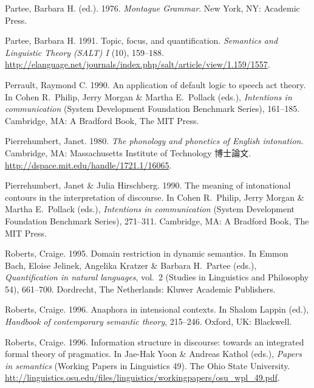 \documentclass{goken}
\newcommand{\ori}[1]{\noindent\textcolor[gray]{0.7}{\fontsize{8pt}{8pt}\selectfont{\textsf{(p.~#1)}}} }
\begin{document}
\begin{thebibliography}{74}
Partee, Barbara H. (ed.). 1976.
\newblock \emph{Montague {G}rammar}.
\newblock New York, NY: Academic Press.

Partee, Barbara H. 1991.
\newblock Topic, focus, and quantification.
\newblock \emph{Semantics and Linguistic Theory (SALT) I} (10), 159--188.
\newblock
  \urlprefix\url{http://elanguage.net/journals/index.php/salt/article/view/1.159/1557}.

Perrault, Raymond C. 1990.
\newblock An application of default logic to speech act theory.
\newblock In Cohen R.~Philip, Jerry Morgan \& Martha E.~Pollack (eds.),
  \emph{Intentions in communication} (System Development Foundation Benchmark
  Series), 161--185. Cambridge, MA: A Bradford Book, The MIT Press.

Pierrehumbert, Janet. 1980.
\newblock \emph{The phonology and phonetics of {E}nglish intonation}.
\newblock Cambridge, MA: Massachusetts Institute of Technology 博士論文.
\newblock \urlprefix\url{http://dspace.mit.edu/handle/1721.1/16065}.

Pierrehumbert, Janet \& Julia Hirschberg. 1990.
\newblock The meaning of intonational contours in the interpretation of
  discourse.
\newblock In Cohen R.~Philip, Jerry Morgan \& Martha E.~Pollack (eds.),
  \emph{Intentions in communication} (System Development Foundation Benchmark
  Series), 271--311. Cambridge, MA: A Bradford Book, The MIT Press.

Roberts, Craige. 1995.
\newblock Domain restriction in dynamic semantics.
\newblock In Emmon Bach, Eloise Jelinek, Angelika Kratzer \& Barbara H.~Partee
  (eds.), \emph{Quantification in natural languages}, vol.~2 (Studies in
  Linguistics and Philosophy 54), 661--700. Dordrecht, The Netherlands: Kluwer
  Academic Publishers.

Roberts, Craige. 1996{}.
\newblock Anaphora in intensional contexts.
\newblock In Shalom Lappin (ed.), \emph{Handbook of contemporary semantic
  theory}, 215--246. Oxford, UK: Blackwell.

Roberts, Craige. 1996{}.
\newblock Information structure in discourse: towards an integrated formal
  theory of pragmatics.
  \newblock In Jae-Hak Yoon \& Andreas Kathol (eds.), \ori{68} \emph{Papers in semantics}
  (Working Papers in Linguistics 49). The Ohio State University.
\newblock
  \urlprefix\url{htt://linguistics.osu.edu/files/linguistics/workingpapers/osu_wpl_49.pdf}.


\end{thebibliography}
\end{document}
